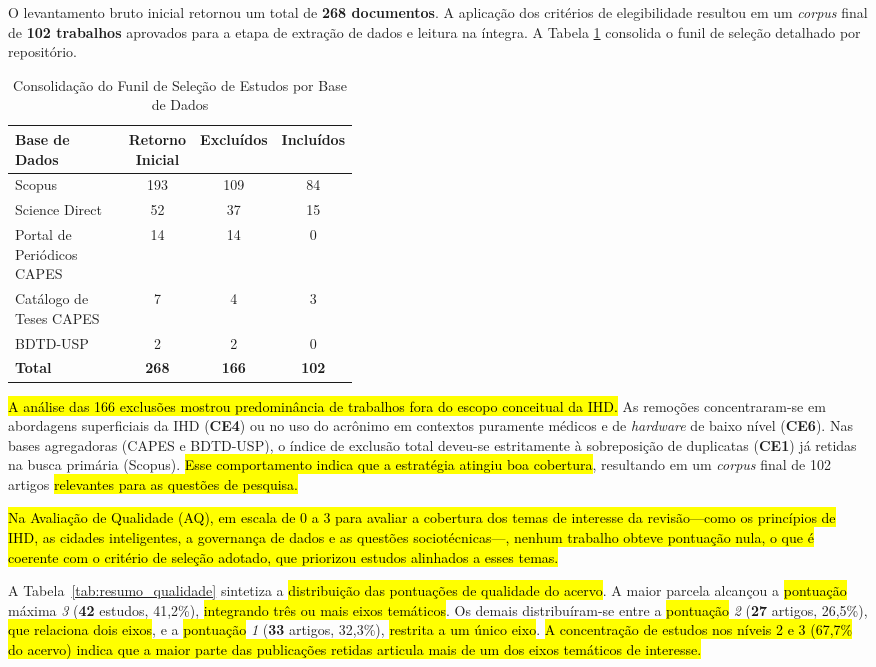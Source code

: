 \documentclass[12pt]{article}
\begin{document}
O levantamento bruto inicial retornou um total de \textbf{268 documentos}. A aplicação dos critérios de elegibilidade resultou em um \textit{corpus} final de \textbf{102 trabalhos} aprovados para a etapa de extração de dados e leitura na íntegra. A Tabela \ref{tab:funil_selecao} consolida o funil de seleção detalhado por repositório.

\begin{table}[H]
\centering
\caption{Consolidação do Funil de Seleção de Estudos por Base de Dados}
\label{tab:funil_selecao}
\small
\begin{tabular}{p{0.40\linewidth} c c c}
\hline
\textbf{Base de Dados} & \textbf{Retorno Inicial} & \textbf{Excluídos} & \textbf{Incluídos} \\ \hline
Scopus & 193 & 109 & 84 \\
Science Direct & 52 & 37 & 15 \\
Portal de Periódicos CAPES & 14 & 14 & 0 \\
Catálogo de Teses CAPES & 7 & 4 & 3 \\
BDTD-USP & 2 & 2 & 0 \\ \hline
\textbf{Total} & \textbf{268} & \textbf{166} & \textbf{102} \\ \hline
\end{tabular}
\end{table}
\vspace{-0.1 cm} 

\hl{A análise das 166 exclusões mostrou predominância de trabalhos fora do escopo conceitual da IHD.} As remoções concentraram-se em abordagens superficiais da IHD (\textbf{CE4}) ou no uso do acrônimo em contextos puramente médicos e de \textit{hardware} de baixo nível (\textbf{CE6}). Nas bases agregadoras (CAPES e BDTD-USP), o índice de exclusão total deveu-se estritamente à sobreposição de duplicatas (\textbf{CE1}) já retidas na busca primária (Scopus). \hl{Esse comportamento indica que a estratégia atingiu boa cobertura}, resultando em um \textit{corpus} final de 102 artigos \hl{relevantes para as questões de pesquisa.}

\hl{Na Avaliação de Qualidade (AQ), em escala de 0 a 3 para avaliar a cobertura dos temas de interesse da revisão---como os princípios de IHD, as cidades inteligentes, a governança de dados e as questões sociotécnicas---, nenhum trabalho obteve pontuação nula, o que é coerente com o critério de seleção adotado, que priorizou estudos alinhados a esses temas.}

A Tabela~\ref{tab:resumo_qualidade} sintetiza a \hl{distribuição das pontuações de qualidade do acervo}. A maior parcela alcançou a \hl{pontuação} máxima \emph{3} (\textbf{42} estudos, 41,2\%), \hl{integrando três ou mais eixos temáticos}. Os demais distribuíram-se entre a \hl{pontuação} \emph{2} (\textbf{27} artigos, 26,5\%), \hl{que relaciona dois eixos}, e a \hl{pontuação} \emph{1} (\textbf{33} artigos, 32,3\%), \hl{restrita a um único eixo}. \hl{A concentração de estudos nos níveis 2 e 3 (67,7\% do acervo) indica que a maior parte das publicações retidas articula mais de um dos eixos temáticos de interesse.}
\end{document}
